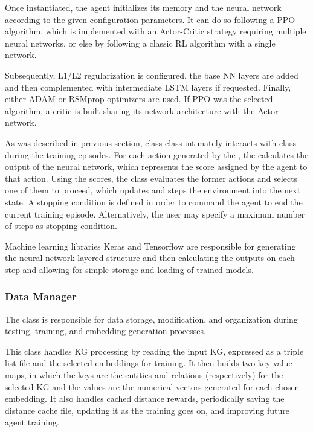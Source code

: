 Once instantiated, the agent initializes its memory and the neural network according to the given configuration parameters. It can do so following a PPO algorithm, which is implemented with an Actor-Critic strategy requiring multiple neural networks, or else by following a classic RL algorithm with a single network.

Subsequently, L1/L2 regularization is configured, the base NN layers are added and then complemented with intermediate LSTM layers 
\cite{hochreiter1997long} if requested. Finally, either ADAM \cite{kingma2014adam} or RSMprop \cite{graves2013generating} optimizers are used. If PPO was the selected algorithm, a critic is built sharing its network architecture with the Actor network.

As was described in previous section, class  class intimately interacts with class  during the training episodes. For each action generated by the , the  calculates the output of the neural network, which represents the score assigned by the agent to that action. Using the scores, the  class evaluates the former actions and selects one of them to proceed, which updates and steps the environment into the next state.
A stopping condition is defined in order to command the agent to end the current training episode. Alternatively, the user may specify a maximum number of steps as stopping condition.  

Machine learning libraries Keras \cite{Keras} and Tensorflow\cite{TensorFlow} are responsible for generating the neural network layered structure and then calculating the outputs on each step and allowing for simple storage and loading of trained models.

\subsubsection{Data Manager}
The  class is responsible for data storage, modification, and organization during testing, training, and embedding generation processes. 

This class handles KG processing by reading the input KG, expressed as a triple list file and the selected embeddings for training. It then builds two key-value maps, in which the keys are the entities and relations (respectively) for the selected KG and the values are the numerical vectors generated for each chosen embedding. It also handles cached distance rewards, periodically saving the distance cache file, updating it as the training goes on, and improving future agent training.

